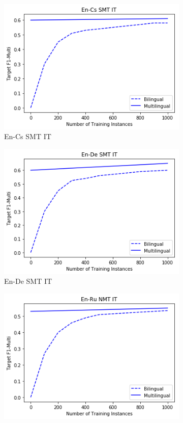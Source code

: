 \begin{figure}
	\centering
	\begin{subfigure}[b]{\figlength}
		\centering\includegraphics[width=\figlength]{figures/translation_quality_estimation/word_level/en_cs_smt_it.png}
		\caption{En-Cs SMT IT}
		\label{fig:en_cs_smt_results}
	\end{subfigure}
	\begin{subfigure}[b]{\figlength}
		\centering\includegraphics[width=\figlength]{figures/translation_quality_estimation/word_level/en_de_smt_it.png}
		\caption{En-De SMT IT}
		\label{fig:en_de_smt_it_results}
	\end{subfigure}
	\begin{subfigure}[b]{\figlength}
		\centering\includegraphics[width=\figlength]{figures/translation_quality_estimation/word_level/en_ru_nmt_it.png}

\end{subfigure}
\end{figure}
